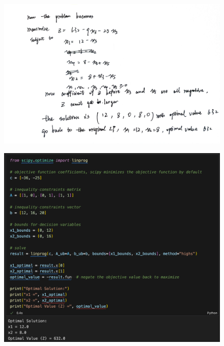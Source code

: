 \documentclass[10pt]{article}
\begin{document}
\begin{figure}[H]
  \centering
  \includegraphics[width=\linewidth]{../assets/2.jpg}
\end{figure}

\begin{figure}[H]
  \centering
  \includegraphics[width=\linewidth]{../assets/scipy_linprog.png}
\end{figure}
\end{document}
